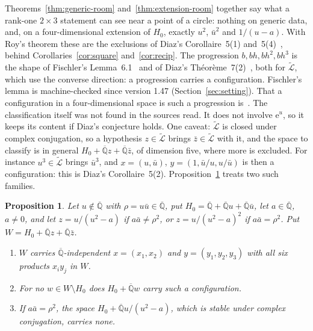 \documentclass[11pt,a4paper]{article}
\theoremstyle{plain}
\newtheorem{proposition}[theorem]{Proposition}
\theoremstyle{definition}
\newcommand{\e}{\mathrm{e}}
\newcommand{\Alg}{\overline{\mathbb{Q}}}
\newcommand{\aLogs}{\widetilde{\mathcal{L}}}
\begin{document}
Theorems~\ref{thm:generic-room} and~\ref{thm:extension-room} together say what a rank-one $2\times3$
statement can see near a point of a circle: nothing on generic data, and, on a four-dimensional
extension of $H_{0}$, exactly $u^{2}$, $\bar u^{2}$ and $1/(u-a)$. With Roy's theorem these are the
exclusions of Diaz's Corollaire~5(1) and~5(4)~\cite{diaz-2007}, behind Corollaries~\ref{cor:square}
and~\ref{cor:recip}. The progression $b,bh,bh^{2},bh^{3}$ is the shape of Fischler's
Lemma~6.1~\cite{fischler-2001} and of Diaz's Th\'eor\`eme~7(2)~\cite{diaz-2007}, both for $\aLogs$, which use the
converse direction: a progression carries a configuration. Fischler's lemma is machine-checked since version 1.47
(Section~\ref{sec:setting}). That a configuration
in a four-dimensional space is such a progression is~\cite[Lemma~4]{bachoc-serra-zemor}. The
classification itself was not found in the sources read. It does not involve $\e^{u}$, so it keeps its content if Diaz's conjecture holds. One
caveat: $\aLogs$ is closed under complex conjugation, so a hypothesis $z\in\aLogs$ brings $\bar z\in\aLogs$
with it, and the space to classify is in general $H_{0}+\Alg z+\Alg\bar z$, of dimension five, where
more is excluded. For instance $u^{3}\in\aLogs$ brings $\bar u^{3}$, and $x=(u,\bar u)$,
$y=(1,\bar u/u,u/\bar u)$ is then a configuration: this is Diaz's Corollaire~5(2).
Proposition~\ref{prop:conjugate-pair} treats two such families.

\begin{proposition}\label{prop:conjugate-pair}
Let $u\notin\Alg$ with $\rho=u\bar u\in\Alg$, put $H_{0}=\Alg+\Alg u+\Alg\bar u$, let $a\in\Alg$, $a\neq0$, and let
$z=u/(u^{2}-a)$ if $a\bar a\neq\rho^{2}$, or $z=u/(u^{2}-a)^{2}$ if $a\bar a=\rho^{2}$. Put
$W=H_{0}+\Alg z+\Alg\bar z$.
\begin{enumerate}[label=\textup{(\arabic*)}]
\item $W$ carries $\Alg$-independent $x=(x_{1},x_{2})$ and $y=(y_{1},y_{2},y_{3})$ with all six products
$x_{i}y_{j}$ in $W$.
\item For no $w\in W\setminus H_{0}$ does $H_{0}+\Alg w$ carry such a configuration.
\item If $a\bar a=\rho^{2}$, the space $H_{0}+\Alg u/(u^{2}-a)$, which is stable under complex conjugation,
carries none.
\end{enumerate}
\end{proposition}
\end{document}
